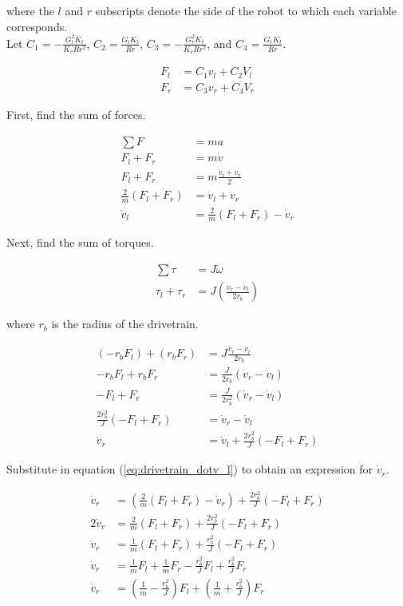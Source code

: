 where the $l$ and $r$ subscripts denote the side of the robot to which each
variable corresponds. \\

Let $C_1 = -\frac{G_l^2 K_t}{K_v R r^2}$, $C_2 = \frac{G_l K_t}{Rr}$,
$C_3 = -\frac{G_r^2 K_t}{K_v R r^2}$, and $C_4 = \frac{G_r K_t}{Rr}$.

\begin{align}
  F_l &= C_1 v_l + C_2 V_l \label{eq:drivetrain_Fl} \\
  F_r &= C_3 v_r + C_4 V_r \label{eq:drivetrain_Fr}
\end{align}

First, find the sum of forces.

\begin{align}
  \sum F &= ma \nonumber \\
  F_l + F_r &= m \dot{v} \nonumber \\
  F_l + F_r &= m \frac{\dot{v}_l + \dot{v}_r}{2} \nonumber \\
  \frac{2}{m} (F_l + F_r) &= \dot{v}_l + \dot{v}_r \nonumber \\
  \dot{v}_l &= \frac{2}{m} (F_l + F_r) - \dot{v}_r \label{eq:drivetrain_dotv_l}
\end{align}

Next, find the sum of torques.

\begin{align*}
  \sum \tau &= J \dot{\omega} \\
  \tau_l + \tau_r &= J \left(\frac{\dot{v}_r - \dot{v}_l}{2 r_b}\right)
\end{align*}

where $r_b$ is the radius of the drivetrain.

\begin{align*}
  (-r_b F_l) + (r_b F_r) &= J \frac{\dot{v}_r - \dot{v}_l}{2 r_b} \\
  -r_b F_l + r_b F_r &= \frac{J}{2 r_b} (\dot{v}_r - \dot{v}_l) \\
  -F_l + F_r &= \frac{J}{2 r_b^2} (\dot{v}_r - \dot{v}_l) \\
  \frac{2 r_b^2}{J} (-F_l + F_r) &= \dot{v}_r - \dot{v}_l \\
  \dot{v}_r &= \dot{v}_l + \frac{2 r_b^2}{J} (-F_l + F_r)
\end{align*}

Substitute in equation (\ref{eq:drivetrain_dotv_l}) to obtain an expression for
$\dot{v}_r$.

\begin{align}
  \dot{v}_r &= \left(\frac{2}{m} (F_l + F_r) - \dot{v}_r\right) +
    \frac{2 r_b^2}{J} (-F_l + F_r) \nonumber \\
  2\dot{v}_r &= \frac{2}{m} (F_l + F_r) + \frac{2 r_b^2}{J} (-F_l + F_r)
    \nonumber \\
  \dot{v}_r &= \frac{1}{m} (F_l + F_r) + \frac{r_b^2}{J} (-F_l + F_r)
    \label{eq:drivetrain_vr_2mid} \\
  \dot{v}_r &= \frac{1}{m} F_l + \frac{1}{m} F_r - \frac{r_b^2}{J} F_l +
    \frac{r_b^2}{J} F_r \nonumber \\
  \dot{v}_r &= \left(\frac{1}{m} - \frac{r_b^2}{J}\right) F_l +
    \left(\frac{1}{m} + \frac{r_b^2}{J}\right) F_r \label{eq:drivetrain_vr_2}
\end{align}


